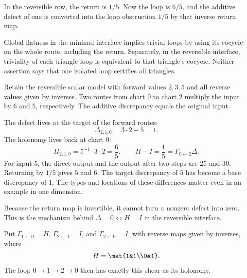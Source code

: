 In the reversible row, the return is $1/5$. Now the loop is $6/5$, and the additive defect of one is converted into the loop obstruction $1/5$ by that inverse return map.

Global flatness in the minimal interface implies trivial loops by using its cocycle on the whole route, including the return. Separately, in the reversible interface, triviality of each triangle loop is equivalent to that triangle's cocycle. Neither assertion says that one isolated loop certifies all triangles.


Retain the reversible scalar model with forward values $2,3,5$ and all reverse values given by inverses. Two routes from chart $0$ to chart $2$ multiply the input by $6$ and $5$, respectively. The additive discrepancy equals the original input.


The defect lives at the target of the forward routes:
\[
\Delta_{2,1,0}=3\cdot2-5=1.
\]
The holonomy lives back at chart $0$:
\[
H_{2,1,0}=5^{-1}\cdot3\cdot2=\frac65,
\qquad H-I=\frac15=\Gamma_{0\leftarrow2}\Delta.
\]
For input $5$, the direct output and the output after two steps are $25$ and $30$. Returning by $1/5$ gives $5$ and $6$. The target discrepancy of $5$ has become a base discrepancy of $1$. The types and locations of these differences matter even in an example in one dimension.

Because the return map is invertible, it cannot turn a nonzero defect into zero. This is the mechanism behind $\Delta=0\Longleftrightarrow H=I$ in the reversible interface.


Put $\Gamma_{1\leftarrow0}=H$, $\Gamma_{2\leftarrow1}=I$, and $\Gamma_{2\leftarrow0}=I$, with reverse maps given by inverses, where
\[
H=\mat{1&1\\0&1}.
\]
The loop $0\to1\to2\to0$ then has exactly this shear as its holonomy.

